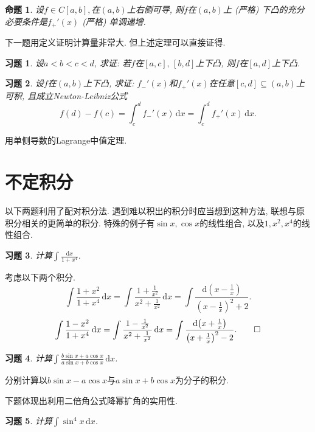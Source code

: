 \documentclass[11pt,a4paper]{ctexart}
\makeatletter
\theoremstyle{thmseries} %
\newtheorem{prop}{命题}[section]
\theoremstyle{exerseries}
\newtheorem{exer}{习题}[section]
\renewenvironment{proof}[1][\proofname]{\par
  \pushQED{\qed}%
  \normalfont \topsep6\p@\@plus6\p@\relax
  \trivlist
  \item[\hskip\labelsep
        \itshape
    #1\@addpunct{}]\ignorespaces
}{%
  \popQED\endtrivlist\@endpefalse
}
\newenvironment{sol}{\begin{proof}[\bfseries\upshape 解\quad]}{\end{proof}}
\newenvironment{pf}{\begin{proof}[\bfseries\upshape 证\quad]}{\end{proof}}
\newcommand{\bra}[1]{\mathopen{}\left(#1\right)}
\renewcommand{\d}{\mathrm{d}}
\makeatother
\begin{document}
\begin{prop}
	设$f\in C[a,b],$在$(a,b)$上右侧可导, 则$f$在$(a,b)$上 (严格) 下凸的充分必要条件是$f_+'(x)$ (严格) 单调递增. 
\end{prop}

下一题用定义证明计算量非常大. 但上述定理可以直接证得. 
\begin{exer}
	设$a<b<c<d$, 求证: 若$f$在$[a,c],\,[b,d]$上下凸, 则$f$在$[a,d]$上下凸. 
\end{exer}

\begin{exer}
	设$f$在$(a,b)$上下凸, 求证: $f_-'(x)$和$f_+'(x)$在任意$[c,d]\subseteq(a,b)$上可积, 且成立Newton-Leibniz公式
	\[f(d)-f(c)=\int_{c}^{d}f_-'(x)\,\d x=\int_{c}^{d}f_+'(x)\,\d x.\]
\end{exer}
\begin{pf}
	用单侧导数的Lagrange中值定理. 
\end{pf}


\section{不定积分}
以下两题利用了配对积分法. 遇到难以积出的积分时应当想到这种方法, 联想与原积分相关的更简单的积分. 特殊的例子有$\sin x,\cos x$的线性组合, 以及$1,x^2,x^4$的线性组合. 
\begin{exer}
	计算$\int\frac{\d x}{1+x^4}$. 
\end{exer}
\begin{sol}
	考虑以下两个积分. 
	\[\int\frac{1+x^2}{1+x^4}\,\d x=\int\frac{1+\frac{1}{x^2}}{x^2+\frac{1}{x^2}}\,\d x=\int\frac{\d\bra{x-\frac{1}{x}}}{\bra{x-\frac{1}{x}}^2+2}.\]
	\[\int\frac{1-x^2}{1+x^4}\,\d x=\int\frac{1-\frac{1}{x^2}}{x^2+\frac{1}{x^2}}\,\d x=\int\frac{\d\bra{x+\frac{1}{x}}}{\bra{x+\frac{1}{x}}^2-2}.\qedhere\]
\end{sol}

\begin{exer}
	计算$\int\frac{b\sin x+a\cos x}{a\sin x+b\cos x}\,\d x$. 
\end{exer}
\begin{sol}
	分别计算以$b\sin x-a\cos x$与$a\sin x+b\cos x$为分子的积分. 
\end{sol}

下题体现出利用二倍角公式降幂扩角的实用性. 
\begin{exer}
	计算$\int \sin^4x\,\d x$. 
\end{exer}

\end{document}
